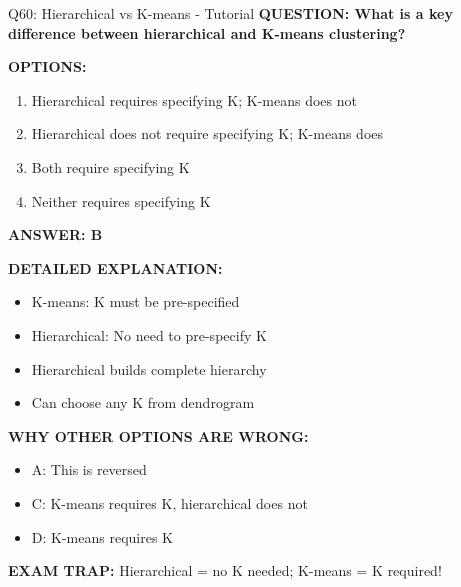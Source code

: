 \documentclass[8pt]{beamer}
\begin{document}
	\begin{frame}{Q60: Hierarchical vs K-means - Tutorial}
		\fontsize{6.5}{7.5}\selectfont
		\textbf{QUESTION: What is a key difference between hierarchical and K-means clustering?}
		
		\vspace{0.1cm}
		\textbf{OPTIONS:}
		\begin{enumerate}
			\item Hierarchical requires specifying K; K-means does not
			\item Hierarchical does not require specifying K; K-means does
			\item Both require specifying K
			\item Neither requires specifying K
		\end{enumerate}
		
		\vspace{0.1cm}
		\textcolor{myblue}{\textbf{ANSWER: B}}
		
		\vspace{0.1cm}
		\textbf{DETAILED EXPLANATION:}
		\begin{itemize}
			\item K-means: K must be pre-specified
			\item Hierarchical: No need to pre-specify K
			\item Hierarchical builds complete hierarchy
			\item Can choose any K from dendrogram
		\end{itemize}
		
		\vspace{0.1cm}
		\textcolor{myred}{\textbf{WHY OTHER OPTIONS ARE WRONG:}}
		\begin{itemize}
			\item \textcolor{myred}{A:} This is reversed
			\item \textcolor{myred}{C:} K-means requires K, hierarchical does not
			\item \textcolor{myred}{D:} K-means requires K
		\end{itemize}
		
		\textcolor{myred}{\textbf{EXAM TRAP:}} Hierarchical = \textcolor{myblue}{no K needed}; K-means = \textcolor{myblue}{K required}!
	\end{frame}
	
\end{document}
